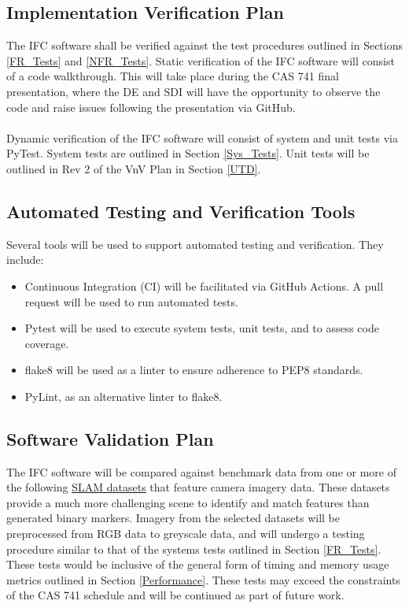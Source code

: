 \documentclass[12pt, titlepage]{article}
\begin{document}
\subsection{Implementation Verification Plan}
The IFC software shall be verified against the test procedures outlined in Sections \ref{FR_Tests} and 
\ref{NFR_Tests}. Static verification of the IFC software will consist of a code walkthrough. This will take 
place during the CAS 741 final presentation, where the DE and SDI will have the opportunity to observe 
the code and raise issues following the presentation via GitHub. \\ \\
Dynamic verification of the IFC software will consist of system and unit tests via PyTest. System tests 
are outlined in Section \ref{Sys_Tests}. Unit tests will be outlined in Rev 2 of the VnV Plan in 
Section \ref{UTD}.

\subsection{Automated Testing and Verification Tools}
Several tools will be used to support automated testing and verification. They include:
\begin{itemize}
\item Continuous Integration (CI) will be facilitated via GitHub Actions. A pull request will be used 
to run automated tests.
\item Pytest will be used to execute system tests, unit tests, and to assess code coverage. 
\item flake8 will be used as a linter to ensure adherence to PEP8 standards. 
\item PyLint, as an alternative linter to flake8.
\end{itemize}

\subsection{Software Validation Plan}
The IFC software will be compared against benchmark data from one or more of the following 
\href{https://github.com/youngguncho/awesome-slam-datasets}{SLAM datasets} that feature camera imagery data. 
These datasets provide a much more challenging scene to identify and match features than generated binary markers. 
Imagery from the selected datasets will be preprocessed 
from RGB data to greyscale data, and will undergo a testing procedure similar to that of the systems tests 
outlined in Section \ref{FR_Tests}. These tests would be inclusive of the general form of timing and memory 
usage  metrics outlined in Section \ref{Performance}. These tests may exceed the constraints of the  CAS 
741 schedule and will be continued as part of future work.
\end{document}
